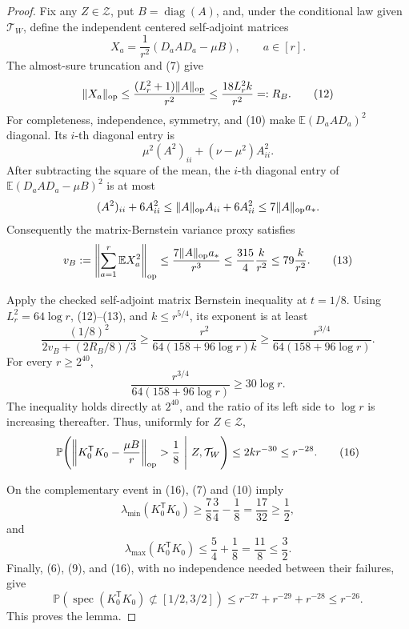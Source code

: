 \begin{proof}
Fix any \(Z\in\mathcal Z\), put \(B=\operatorname{diag}(A)\), and, under
the conditional law given \(\mathcal T_W\), define the independent centered
self-adjoint matrices
\[
  X_a=\frac1{r^2}(D_aAD_a-\mu B),\qquad a\in[r].            \tag{11}
\]
The almost-sure truncation and (7) give
\[
  \|X_a\|_{\rm op}
  \le\frac{(L_r^2+1)\|A\|_{\rm op}}{r^2}
  \le\frac{18L_r^2k}{r^2}=:R_B.                            \tag{12}
\]
For completeness, independence, symmetry, and (10) make
\(\mathbb E(D_aAD_a)^2\) diagonal. Its \(i\)-th diagonal entry is
\[
  \mu^2(A^2)_{ii}+(\nu-\mu^2)A_{ii}^2.
\]
After subtracting the square of the mean, the \(i\)-th diagonal entry of
\(\mathbb E(D_aAD_a-\mu B)^2\) is at most
\[
  (A^2)_{ii}+6A_{ii}^2
  \le \|A\|_{\rm op}A_{ii}+6A_{ii}^2
  \le7\|A\|_{\rm op}a_*.
\]
Consequently the matrix-Bernstein variance proxy satisfies
\[
  v_B:=\left\|\sum_{a=1}^r\mathbb EX_a^2\right\|_{\rm op}
  \le\frac{7\|A\|_{\rm op}a_*}{r^3}
  \le\frac{315}{4}\frac{k}{r^2}
  \le79\frac{k}{r^2}.                                     \tag{13}
\]

Apply the checked self-adjoint matrix Bernstein inequality at \(t=1/8\).
Using \(L_r^2=64\log r\), (12)--(13), and
\(k\le r^{5/4}\), its exponent is at least
\[
  \frac{(1/8)^2}{2v_B+(2R_B/8)/3}
  \ge\frac{r^2}{64(158+96\log r)k}
  \ge\frac{r^{3/4}}{64(158+96\log r)}.                    \tag{14}
\]
For every \(r\ge2^{40}\),
\[
  \frac{r^{3/4}}{64(158+96\log r)}\ge30\log r.            \tag{15}
\]
The inequality holds directly at \(2^{40}\), and the ratio of its left side
to \(\log r\) is increasing thereafter. Thus, uniformly for
\(Z\in\mathcal Z\),
\[
  \mathbb P\!\left(
    \left\|K_0^{\mathsf T}K_0-\frac{\mu B}{r}\right\|_{\rm op}
      >\frac18
    \ \middle|\ Z,\mathcal T_W
  \right)
  \le2kr^{-30}\le r^{-28}.                                \tag{16}
\]

On the complementary event in (16), (7) and (10) imply
\[
  \lambda_{\min}(K_0^{\mathsf T}K_0)
  \ge\frac78\frac34-\frac18
  =\frac{17}{32}\ge\frac12,                               \tag{17}
\]
and
\[
  \lambda_{\max}(K_0^{\mathsf T}K_0)
  \le\frac54+\frac18
  =\frac{11}{8}\le\frac32.                                \tag{18}
\]
Finally, (6), (9), and (16), with no independence needed between their
failures, give
\[
  \mathbb P\!\left(
    \operatorname{spec}(K_0^{\mathsf T}K_0)
      \not\subset[1/2,3/2]
  \right)
  \le r^{-27}+r^{-29}+r^{-28}
  \le r^{-26}.
\]
This proves the lemma. 

\end{proof}


